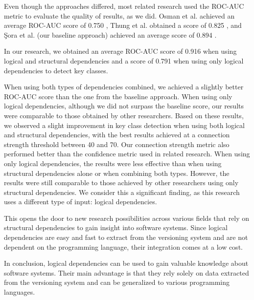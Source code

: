 Even though the approaches differed, most related research used the ROC-AUC metric to evaluate the quality of results, as we did. Osman et al. achieved an average ROC-AUC score of 0.750 \cite{6676885}, Thung et al. obtained a score of 0.825 \cite{rocclasification}, and Şora et al. (our baseline approach) achieved an average score of 0.894 \cite{Finding-key-classes}.

In our research, we obtained an average ROC-AUC score of 0.916 when using logical and structural dependencies and a score of 0.791 when using only logical dependencies to detect key classes.

When using both types of dependencies combined, we achieved a slightly better ROC-AUC score than the one from the baseline approach. When using only logical dependencies, although we did not surpass the baseline score, our results were comparable to those obtained by other researchers. Based on these results, we observed a slight improvement in key class detection when using both logical and structural dependencies, with the best results achieved at a connection strength threshold between 40 and 70. Our connection strength metric also performed better than the confidence metric used in related research. When using only logical dependencies, the results were less effective than when using structural dependencies alone or when combining both types. However, the results were still comparable to those achieved by other researchers using only structural dependencies. We consider this a significant finding, as this research uses a different type of input: logical dependencies.

This opens the door to new research possibilities across various fields that rely on structural dependencies to gain insight into software systems. Since logical dependencies are easy and fast to extract from the versioning system and are not dependent on the programming language, their integration comes at a low cost.

In conclusion, logical dependencies can be used to gain valuable knowledge about software systems. Their main advantage is that they rely solely on data extracted from the versioning system and can be generalized to various programming languages.
